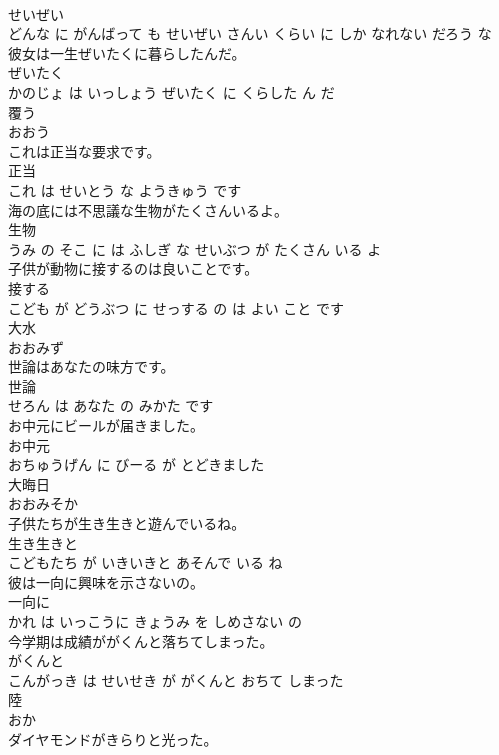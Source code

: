 \documentclass[8pt]{extreport}
\begin{document}
\begin{CJK}{UTF8}{min}
\\	せいぜい 
\\	どんな に がんばって も せいぜい さんい くらい に しか なれない だろう な			
\\	彼女は一生ぜいたくに暮らしたんだ。	
\\	ぜいたく 
\\	かのじょ は いっしょう ぜいたく に くらした ん だ			
\\	覆う	
\\	おおう			
\\	これは正当な要求です。	
\\	正当 
\\	これ は せいとう な ようきゅう です			
\\	海の底には不思議な生物がたくさんいるよ。	
\\	生物 
\\	うみ の そこ に は ふしぎ な せいぶつ が たくさん いる よ			
\\	子供が動物に接するのは良いことです。	
\\	接する 
\\	こども が どうぶつ に せっする の は よい こと です			
\\	大水	
\\	おおみず			
\\	世論はあなたの味方です。	
\\	世論 
\\	せろん は あなた の みかた です			
\\	お中元にビールが届きました。	
\\	お中元 
\\	おちゅうげん に びーる が とどきました			
\\	大晦日	
\\	おおみそか			
\\	子供たちが生き生きと遊んでいるね。	
\\	生き生きと 
\\	こどもたち が いきいきと あそんで いる ね			
\\	彼は一向に興味を示さないの。	
\\	一向に 
\\	かれ は いっこうに きょうみ を しめさない の			
\\	今学期は成績ががくんと落ちてしまった。	
\\	がくんと 
\\	こんがっき は せいせき が がくんと おちて しまった			
\\	陸	
\\	おか			
\\	ダイヤモンドがきらりと光った。	

\end{CJK}
\end{document}
